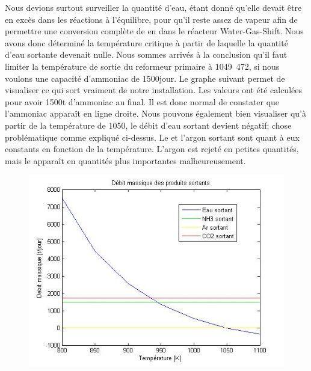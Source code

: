 \newpage
Nous devions surtout surveiller la quantité d'eau, étant donné qu'elle devait être en excès dans les réactions à
l'équilibre, pour qu'il reste assez de vapeur afin de permettre une conversion complète de  en  dans le
réacteur Water-Gas-Shift.
Nous avons donc déterminé la température critique à partir de laquelle la quantité d'eau sortante devenait nulle.
Nous sommes arrivés à la conclusion qu'il faut limiter la température de sortie du reformeur primaire à
\unit{1049.472}{\kelvin}, si nous voulons une capacité d'ammoniac de \unit{1500}{\ton\per jour}.
Le graphe suivant permet de visualiser ce qui sort vraiment de notre installation. Les valeurs ont été calculées pour
avoir 1500t d'ammoniac au final. Il est donc normal de constater que l'ammoniac apparaît en ligne droite.
Nous pouvons également bien visualiser qu'à partir de la température de \unit{1050}{\kelvin}, le débit d'eau sortant devient
négatif; chose problématique comme expliqué ci-dessus.
Le  et l'argon sortant sont quant à eux constants en fonction de la température. L'argon est rejeté en petites quantités, mais le 
apparaît en quantités plus importantes malheureusement.
\begin{figure}[ht!]
\centering
\includegraphics[scale=0.6]{produits.jpg}
\label{produits_sortants}
\end{figure}
